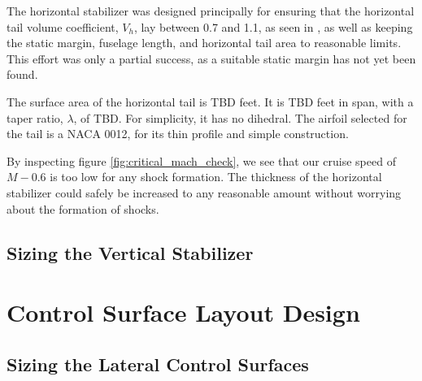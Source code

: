 \documentclass[conf]{new-aiaa}
\begin{document}
The horizontal stabilizer was designed principally for ensuring that the horizontal tail volume coefficient, $V_h$, lay between 0.7 and 1.1, as seen in \cite{orange_book}, as well as keeping the static margin, fuselage length, and horizontal tail area to reasonable limits. This effort was only a partial success, as a suitable static margin has not yet been found. 


The surface area of the horizontal tail is TBD feet. It is TBD feet in span, with a taper ratio, $\lambda$, of TBD. For simplicity, it has no dihedral. The airfoil selected for the tail is a NACA 0012, for its thin profile and simple construction.

By inspecting figure \ref{fig:critical_mach_check}, we see that our cruise speed of $M-0.6$ is too low for any shock formation. The thickness of the horizontal stabilizer could safely be increased to any reasonable amount without worrying about the formation of shocks.

\subsection{Sizing the Vertical Stabilizer}

\section{Control Surface Layout Design}
\subsection{Sizing the Lateral Control Surfaces}
\end{document}
